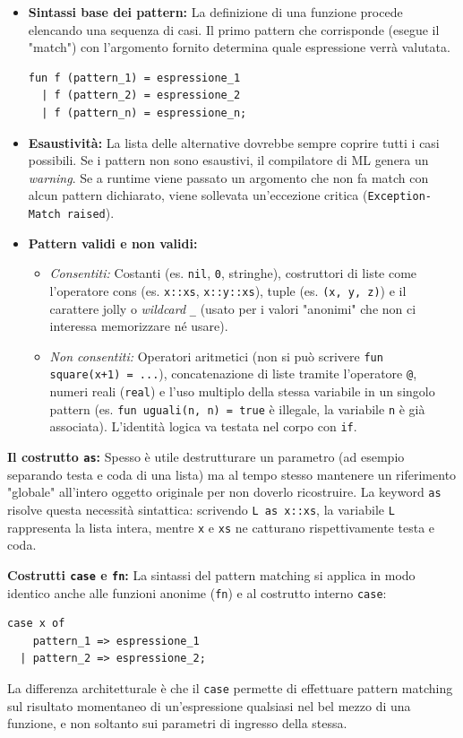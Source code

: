 \documentclass[12pt, a4paper]{article}
\begin{document}
\begin{itemize}
    \item \textbf{Sintassi base dei pattern:} La definizione di una funzione procede elencando una sequenza di casi. Il primo pattern che corrisponde (esegue il "match") con l'argomento fornito determina quale espressione verrà valutata.
    \begin{verbatim}
fun f (pattern_1) = espressione_1
  | f (pattern_2) = espressione_2
  | f (pattern_n) = espressione_n;
    \end{verbatim}
    \item \textbf{Esaustività:} La lista delle alternative dovrebbe sempre coprire tutti i casi possibili. Se i pattern non sono esaustivi, il compilatore di ML genera un \textit{warning}. Se a runtime viene passato un argomento che non fa match con alcun pattern dichiarato, viene sollevata un'eccezione critica (\texttt{Exception- Match raised}).
    \item \textbf{Pattern validi e non validi:}
    \begin{itemize}
        \item \textit{Consentiti:} Costanti (es. \texttt{nil}, \texttt{0}, stringhe), costruttori di liste come l'operatore cons (es. \texttt{x::xs}, \texttt{x::y::xs}), tuple (es. \texttt{(x, y, z)}) e il carattere jolly o \textit{wildcard} \texttt{\_} (usato per i valori "anonimi" che non ci interessa memorizzare né usare).
        \item \textit{Non consentiti:} Operatori aritmetici (non si può scrivere \texttt{fun square(x+1) = ...}), concatenazione di liste tramite l'operatore \texttt{@}, numeri reali (\texttt{real}) e l'uso multiplo della stessa variabile in un singolo pattern (es. \texttt{fun uguali(n, n) = true} è illegale, la variabile \texttt{n} è già associata). L'identità logica va testata nel corpo con \texttt{if}.
    \end{itemize}
\end{itemize}

\textbf{Il costrutto \texttt{as}:}
Spesso è utile destrutturare un parametro (ad esempio separando testa e coda di una lista) ma al tempo stesso mantenere un riferimento "globale" all'intero oggetto originale per non doverlo ricostruire. La keyword \texttt{as} risolve questa necessità sintattica: scrivendo \texttt{L as x::xs}, la variabile \texttt{L} rappresenta la lista intera, mentre \texttt{x} e \texttt{xs} ne catturano rispettivamente testa e coda.

\textbf{Costrutti \texttt{case} e \texttt{fn}:}
La sintassi del pattern matching si applica in modo identico anche alle funzioni anonime (\texttt{fn}) e al costrutto interno \texttt{case}:
\begin{verbatim}
case x of
    pattern_1 => espressione_1
  | pattern_2 => espressione_2;
\end{verbatim}
La differenza architetturale è che il \texttt{case} permette di effettuare pattern matching sul risultato momentaneo di un'espressione qualsiasi nel bel mezzo di una funzione, e non soltanto sui parametri di ingresso della stessa.
\end{document}
